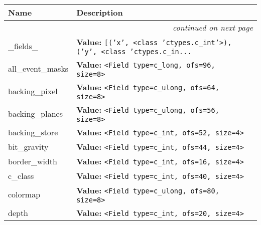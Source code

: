     \vspace{-1cm}
\hspace{\varindent}\begin{longtable}{|p{\varnamewidth}|p{\vardescrwidth}|l}
\cline{1-2}
\cline{1-2} \centering \textbf{Name} & \centering \textbf{Description}& \\
\cline{1-2}
\endhead\cline{1-2}\multicolumn{3}{r}{\small\textit{continued on next page}}\\\endfoot\cline{1-2}
\endlastfoot\raggedright \_\-f\-i\-e\-l\-d\-s\-\_\- & \raggedright \textbf{Value:} 
{\tt \texttt{[}\texttt{(}\texttt{'}\texttt{x}\texttt{'}\texttt{, }{\textless}class 'ctypes.c\_int'{\textgreater}\texttt{)}\texttt{, }\texttt{(}\texttt{'}\texttt{y}\texttt{'}\texttt{, }{\textless}class 'ctypes.c\_in\texttt{...}}&\\
\cline{1-2}
\raggedright a\-l\-l\-\_\-e\-v\-e\-n\-t\-\_\-m\-a\-s\-k\-s\- & \raggedright \textbf{Value:} 
{\tt {\textless}Field type=c\_long, ofs=96, size=8{\textgreater}}&\\
\cline{1-2}
\raggedright b\-a\-c\-k\-i\-n\-g\-\_\-p\-i\-x\-e\-l\- & \raggedright \textbf{Value:} 
{\tt {\textless}Field type=c\_ulong, ofs=64, size=8{\textgreater}}&\\
\cline{1-2}
\raggedright b\-a\-c\-k\-i\-n\-g\-\_\-p\-l\-a\-n\-e\-s\- & \raggedright \textbf{Value:} 
{\tt {\textless}Field type=c\_ulong, ofs=56, size=8{\textgreater}}&\\
\cline{1-2}
\raggedright b\-a\-c\-k\-i\-n\-g\-\_\-s\-t\-o\-r\-e\- & \raggedright \textbf{Value:} 
{\tt {\textless}Field type=c\_int, ofs=52, size=4{\textgreater}}&\\
\cline{1-2}
\raggedright b\-i\-t\-\_\-g\-r\-a\-v\-i\-t\-y\- & \raggedright \textbf{Value:} 
{\tt {\textless}Field type=c\_int, ofs=44, size=4{\textgreater}}&\\
\cline{1-2}
\raggedright b\-o\-r\-d\-e\-r\-\_\-w\-i\-d\-t\-h\- & \raggedright \textbf{Value:} 
{\tt {\textless}Field type=c\_int, ofs=16, size=4{\textgreater}}&\\
\cline{1-2}
\raggedright c\-\_\-c\-l\-a\-s\-s\- & \raggedright \textbf{Value:} 
{\tt {\textless}Field type=c\_int, ofs=40, size=4{\textgreater}}&\\
\cline{1-2}
\raggedright c\-o\-l\-o\-r\-m\-a\-p\- & \raggedright \textbf{Value:} 
{\tt {\textless}Field type=c\_ulong, ofs=80, size=8{\textgreater}}&\\
\cline{1-2}
\raggedright d\-e\-p\-t\-h\- & \raggedright \textbf{Value:} 
{\tt {\textless}Field type=c\_int, ofs=20, size=4{\textgreater}}&\\

\end{longtable}
